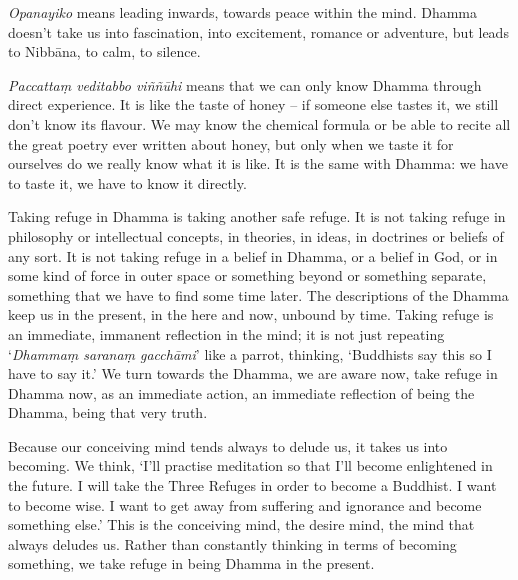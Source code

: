 \textit{Opanayiko} means leading inwards, towards peace within the mind. Dhamma doesn't take us into fascination, into excitement, romance or adventure, but leads to Nibb\=ana, to calm, to silence.

\textit{Paccatta\d{m} veditabbo vi\~n\~n\=uhi} means that we can only know Dhamma through direct experience. It is like the taste of honey -- if someone else tastes it, we still don't know its flavour. We may know the chemical formula or be able to recite all the great poetry ever written about honey, but only when we taste it for ourselves do we really know what it is like. It is the same with Dhamma: we have to taste it, we have to know it directly.

Taking refuge in Dhamma is taking another safe refuge. It is not taking refuge in philosophy or intellectual concepts, in theories, in ideas, in doctrines or beliefs of any sort. It is not taking refuge in a belief in Dhamma, or a belief in God, or in some kind of force in outer space or something beyond or something separate, something that we have to find some time later. The descriptions of the Dhamma keep us in the present, in the here and now, unbound by time. Taking refuge is an immediate, immanent reflection in the mind; it is not just repeating `\textit{Dhamma\d{m} sarana\d{m} gacch\=ami}' like a parrot, thinking, `Buddhists say this so I have to say it.' We turn towards the Dhamma, we are aware now, take refuge in Dhamma now, as an immediate action, an immediate reflection of being the Dhamma, being that very truth.

Because our conceiving mind tends always to delude us, it takes us into becoming. We think, `I'll practise meditation so that I'll become enlightened in the future. I will take the Three Refuges in order to become a Buddhist. I want to become wise. I want to get away from suffering and ignorance and become something else.' This is the conceiving mind, the desire mind, the mind that always deludes us. Rather than constantly thinking in terms of becoming something, we take refuge in being Dhamma in the present.


